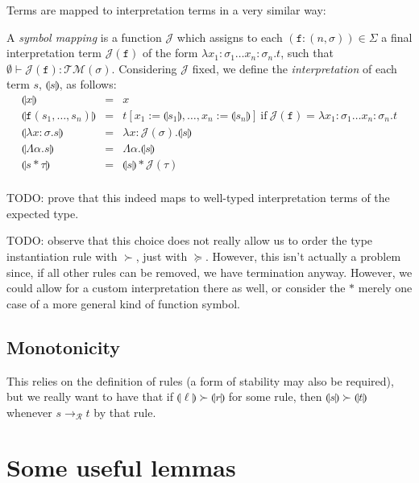 \documentclass[runningheads,a4paper]{llncs}
\newcommand{\Rules}{\mathcal{R}}
\newcommand{\Typemap}{\mathcal{T\!M}}
\newcommand{\Termmap}{\mathcal{J}}
\newcommand{\interpret}[1]{\llparenthesis #1 \rrparenthesis}
\newcommand{\arr}[1]{\to_{#1}}
\newcommand{\abs}[2]{\lambda #1.#2}
\newcommand{\tabs}[2]{\Lambda #1.#2}
\newcommand{\tapp}[2]{#1 * #2}
\begin{document}
Terms are mapped to interpretation terms in a very similar way:

\begin{definition}
A \emph{symbol mapping} is a function $\Termmap$ which assigns to each
$(\mathtt{f}:(n,\sigma)) \in \Sigma$ a final interpretation term
$\Termmap(\mathtt{f})$ of the form $\abs{x_1:\sigma_1 \dots x_n:
\sigma_n}{t}$, such that $\emptyset \vdash \Termmap(\mathtt{f}) :
\Typemap(\sigma)$.  Considering $\Termmap$ fixed, we define the
\emph{interpretation} of each term $s$, $\interpret{s}$, as follows:
\[
\begin{array}{rcl}
\interpret{x} & = & x \\
\interpret{\mathtt{f}(s_1,\dots,s_n)} & = &
  t[x_1:=\interpret{s_1},\dots,x_n:=\interpret{s_n}]\ \text{if}\ 
  \Termmap(\mathtt{f}) = \abs{x_1:\sigma_1 \dots x_n:\sigma_n}{t} \\
\interpret{\abs{x:\sigma}{s}} & = & \abs{x:\Termmap(\sigma)}{
  \interpret{s}} \\
\interpret{\tabs{\alpha}{s}} & = & \tabs{\alpha}{\interpret{s}} \\
\interpret{\tapp{s}{\tau}} & = & \tapp{\interpret{s}}{\Termmap(\tau)} \\
\end{array}
\]
\end{definition}

TODO: prove that this indeed maps to well-typed interpretation terms of
the expected type.

TODO: observe that this choice does not really allow us to order the
type instantiation rule with $\succ$, just with $\succeq$.  However, this
isn't actually a problem since, if all other rules can be removed, we have
termination anyway.  However, we could allow for a custom interpretation
there as well, or consider the $*$ merely one case of a more general kind
of function symbol.

\subsection{Monotonicity}

This relies on the definition of rules (a form of stability may also be
required), but we really want to have that if $\interpret{\ell} \succ
\interpret{r}$ for some rule, then $\interpret{s} \succ \interpret{t}$
whenever $s \arr{\Rules} t$ by that rule.

\section{Some useful lemmas}
\end{document}
